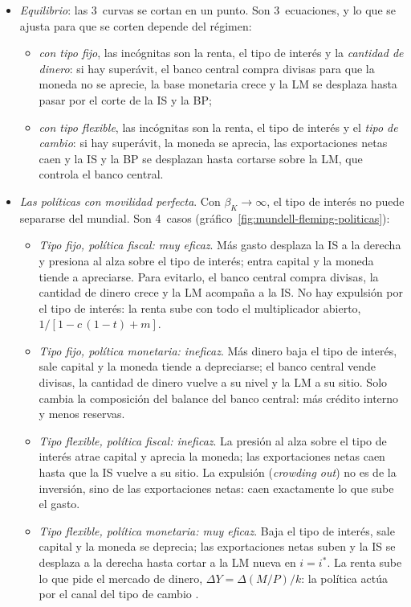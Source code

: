 \documentclass[11pt]{article}
\begin{document}
\begin{itemize}
\item \emph{Equilibrio}: las 3~curvas se cortan en un punto. Son 3~ecuaciones, y lo que se ajusta para que se corten depende del régimen:
  \begin{itemize}
  \item \emph{con tipo fijo}, las incógnitas son la renta, el tipo de interés y la \emph{cantidad de dinero}: si hay superávit, el banco central compra divisas para que la moneda no se aprecie, la base monetaria crece y la LM se desplaza hasta pasar por el corte de la IS y la BP;
  \item \emph{con tipo flexible}, las incógnitas son la renta, el tipo de interés y el \emph{tipo de cambio}: si hay superávit, la moneda se aprecia, las exportaciones netas caen y la IS y la BP se desplazan hasta cortarse sobre la LM, que controla el banco central.
  \end{itemize}
\item \emph{Las políticas con movilidad perfecta}. Con $\beta_K\to\infty$, el tipo de interés no puede separarse del mundial. Son 4~casos (gráfico~\ref{fig:mundell-fleming-politicas}):
  \begin{itemize}
  \item \emph{Tipo fijo, política fiscal: muy eficaz}. Más gasto desplaza la IS a la derecha y presiona al alza sobre el tipo de interés; entra capital y la moneda tiende a apreciarse. Para evitarlo, el banco central compra divisas, la cantidad de dinero crece y la LM acompaña a la IS. No hay expulsión por el tipo de interés: la renta sube con todo el multiplicador abierto, $1/[1-c\,(1-t)+m]$.
  \item \emph{Tipo fijo, política monetaria: ineficaz}. Más dinero baja el tipo de interés, sale capital y la moneda tiende a depreciarse; el banco central vende divisas, la cantidad de dinero vuelve a su nivel y la LM a su sitio. Solo cambia la composición del balance del banco central: más crédito interno y menos reservas.
  \item \emph{Tipo flexible, política fiscal: ineficaz}. La presión al alza sobre el tipo de interés atrae capital y aprecia la moneda; las exportaciones netas caen hasta que la IS vuelve a su sitio. La expulsión (\emph{crowding out}) no es de la inversión, sino de las exportaciones netas: caen exactamente lo que sube el gasto.
  \item \emph{Tipo flexible, política monetaria: muy eficaz}. Baja el tipo de interés, sale capital y la moneda se deprecia; las exportaciones netas suben y la IS se desplaza a la derecha hasta cortar a la LM nueva en $i=i^*$. La renta sube lo que pide el mercado de dinero, $\Delta Y=\Delta(M/P)/k$: la política actúa por el canal del tipo de cambio .

\end{itemize}
\end{itemize}
\end{document}
